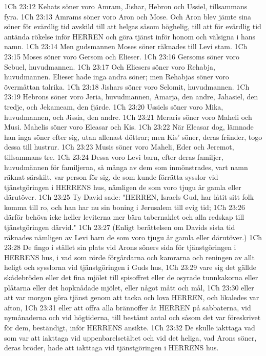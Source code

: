 1Ch 23:12  Kehats söner voro Amram, Jishar, Hebron och Ussiel, tillsammans fyra.
1Ch 23:13  Amrams söner voro Aron och Mose. Och Aron blev jämte sina söner för evärdlig tid avskild till att helgas såsom höghelig, till att för evärdlig tid antända rökelse inför HERREN och göra tjänst inför honom och välsigna i hans namn.
1Ch 23:14  Men gudsmannen Moses söner räknades till Levi stam.
1Ch 23:15  Moses söner voro Gersom och Elieser.
1Ch 23:16  Gersoms söner voro Sebuel, huvudmannen.
1Ch 23:17  Och Eliesers söner voro Rehabja, huvudmannen. Elieser hade inga andra söner; men Rehabjas söner voro övermåttan talrika.
1Ch 23:18  Jishars söner voro Selomit, huvudmannen.
1Ch 23:19  Hebrons söner voro Jeria, huvudmannen, Amarja, den andre, Jahasiel, den tredje, och Jekameam, den fjärde.
1Ch 23:20  Ussiels söner voro Mika, huvudmannen, och Jissia, den andre.
1Ch 23:21  Meraris söner voro Maheli och Musi. Mahelis söner voro Eleasar och Kis.
1Ch 23:22  När Eleasar dog, lämnade han inga söner efter sig, utan allenast döttrar; men Kis' söner, deras fränder, togo dessa till hustrur.
1Ch 23:23  Musis söner voro Maheli, Eder och Jeremot, tillsammans tre.
1Ch 23:24  Dessa voro Levi barn, efter deras familjer, huvudmännen för familjerna, så många av dem som inmönstrades, vart namn räknat särskilt, var person för sig, de som kunde förrätta sysslor vid tjänstgöringen i HERRENS hus, nämligen de som voro tjugu år gamla eller därutöver.
1Ch 23:25  Ty David sade: "HERREN, Israels Gud, har låtit sitt folk komma till ro, och han har nu sin boning i Jerusalem till evig tid;
1Ch 23:26  därför behöva icke heller leviterna mer bära tabernaklet och alla redskap till tjänstgöringen därvid."
1Ch 23:27  (Enligt berättelsen om Davids sista tid räknades nämligen av Levi barn de som voro tjugu år gamla eller därutöver.)
1Ch 23:28  De fingo i stället sin plats vid Arons söners sida för tjänstgöringen i HERRENS hus, i vad som rörde förgårdarna och kamrarna och reningen av allt heligt och sysslorna vid tjänstgöringen i Guds hus,
1Ch 23:29  vare sig det gällde skådebröden eller det fina mjölet till spisoffret eller de osyrade tunnkakorna eller plåtarna eller det hopknådade mjölet, eller något mått och mål,
1Ch 23:30  eller att var morgon göra tjänst genom att tacka och lova HERREN, och likaledes var afton,
1Ch 23:31  eller att offra alla brännoffer åt HERREN på sabbaterna, vid nymånaderna och vid högtiderna, till bestämt antal och såsom det var föreskrivet för dem, beständigt, inför HERRENS ansikte.
1Ch 23:32  De skulle iakttaga vad som var att iakttaga vid uppenbarelsetältet och vid det heliga, vad Arons söner, deras bröder, hade att iakttaga vid tjänstgöringen i HERRENS hus.
